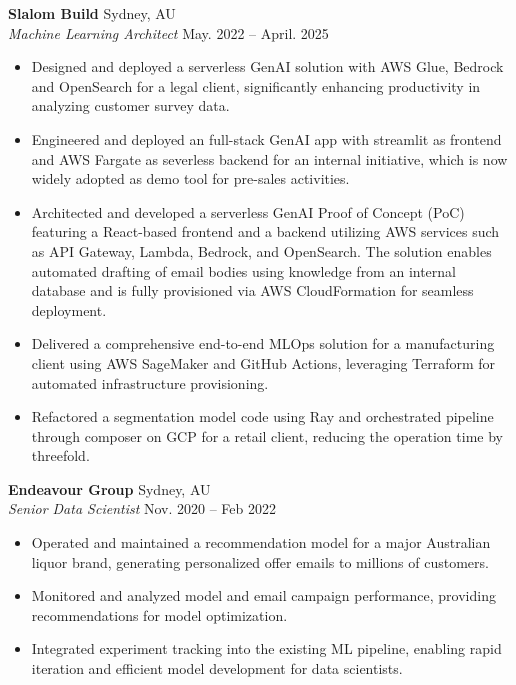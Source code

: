 \documentclass[a4paper,10pt]{article}
\begin{document}
\noindent
\textbf{Slalom Build} \hfill Sydney, AU \\
\textit{Machine Learning Architect} \hfill May. 2022 – April. 2025 \\
\begin{itemize}[leftmargin=0.15in, itemsep=1pt]
    \item Designed and deployed a serverless GenAI solution with AWS Glue, Bedrock and OpenSearch for a legal client, significantly enhancing productivity in analyzing customer survey data.
    \item Engineered and deployed an full-stack GenAI app with streamlit as frontend and AWS Fargate as severless backend for an internal initiative, which is now widely adopted as demo tool for pre-sales activities. 
    \item Architected and developed a serverless GenAI Proof of Concept (PoC) featuring a React-based frontend and a backend utilizing AWS services such as API Gateway, Lambda, Bedrock, and OpenSearch. The solution enables automated drafting of email bodies using knowledge from an internal database and is fully provisioned via AWS CloudFormation for seamless deployment.
    \item Delivered a comprehensive end-to-end MLOps solution for a manufacturing client using AWS SageMaker and GitHub Actions, leveraging Terraform for automated infrastructure provisioning.
    \item Refactored a segmentation model code using Ray and orchestrated pipeline through composer on GCP for a retail client, reducing the operation time by threefold.
\end{itemize}

\vspace{0.1em}

\noindent
\textbf{Endeavour Group} \hfill Sydney, AU \\
\textit{Senior Data Scientist} \hfill Nov. 2020 – Feb 2022 \\
\begin{itemize}[leftmargin=0.15in, itemsep=1pt]
    \item Operated and maintained a recommendation model for a major Australian liquor brand, generating personalized offer emails to millions of customers.
    \item Monitored and analyzed model and email campaign performance, providing recommendations for model optimization.
    \item Integrated experiment tracking into the existing ML pipeline, enabling rapid iteration and efficient model development for data scientists.
\end{itemize}
\end{document}
